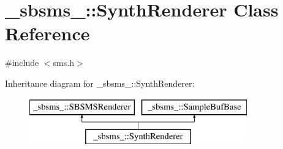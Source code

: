 \hypertarget{class__sbsms___1_1_synth_renderer}{}\section{\+\_\+sbsms\+\_\+\+:\+:Synth\+Renderer Class Reference}
\label{class__sbsms___1_1_synth_renderer}


{\ttfamily \#include $<$sms.\+h$>$}

Inheritance diagram for \+\_\+sbsms\+\_\+\+:\+:Synth\+Renderer\+:\begin{figure}[H]
\begin{center}
\leavevmode
\includegraphics[height=2.000000cm]{class__sbsms___1_1_synth_renderer}
\end{center}
\end{figure}
